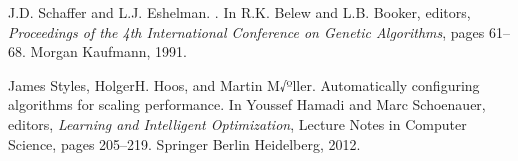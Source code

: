 \documentclass[final,1p,times]{elsarticle}
\begin{document}
\begin{thebibliography}{10}
J.D. Schaffer and L.J. Eshelman.
.
\newblock In R.K. Belew and L.B. Booker, editors, {\em {Proceedings of the 4th
  International Conference on Genetic Algorithms}}, pages 61--68. Morgan
  Kaufmann, 1991.

James Styles, HolgerH. Hoos, and Martin M√ºller.
\newblock Automatically configuring algorithms for scaling performance.
\newblock In Youssef Hamadi and Marc Schoenauer, editors, {\em Learning and
  Intelligent Optimization}, Lecture Notes in Computer Science, pages 205--219.
  Springer Berlin Heidelberg, 2012.

\end{thebibliography}
\end{document}
